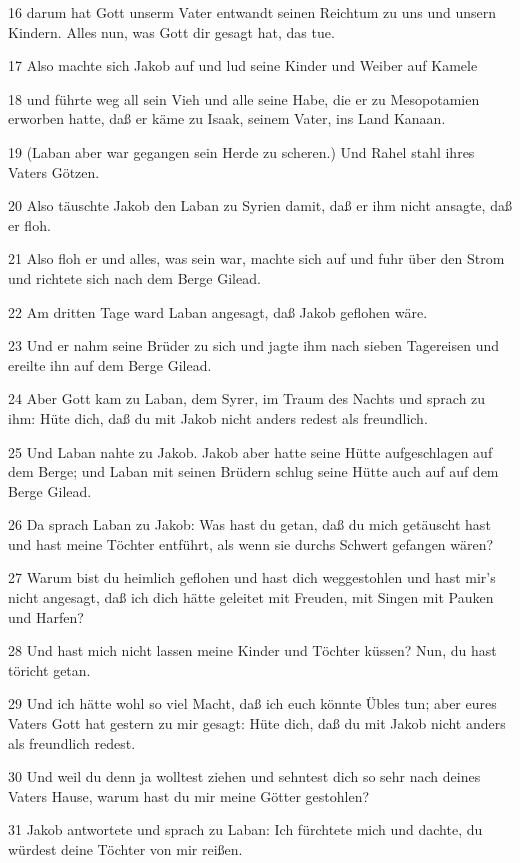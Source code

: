 \par 16 darum hat Gott unserm Vater entwandt seinen Reichtum zu uns und unsern Kindern. Alles nun, was Gott dir gesagt hat, das tue.
\par 17 Also machte sich Jakob auf und lud seine Kinder und Weiber auf Kamele
\par 18 und führte weg all sein Vieh und alle seine Habe, die er zu Mesopotamien erworben hatte, daß er käme zu Isaak, seinem Vater, ins Land Kanaan.
\par 19 (Laban aber war gegangen sein Herde zu scheren.) Und Rahel stahl ihres Vaters Götzen.
\par 20 Also täuschte Jakob den Laban zu Syrien damit, daß er ihm nicht ansagte, daß er floh.
\par 21 Also floh er und alles, was sein war, machte sich auf und fuhr über den Strom und richtete sich nach dem Berge Gilead.
\par 22 Am dritten Tage ward Laban angesagt, daß Jakob geflohen wäre.
\par 23 Und er nahm seine Brüder zu sich und jagte ihm nach sieben Tagereisen und ereilte ihn auf dem Berge Gilead.
\par 24 Aber Gott kam zu Laban, dem Syrer, im Traum des Nachts und sprach zu ihm: Hüte dich, daß du mit Jakob nicht anders redest als freundlich.
\par 25 Und Laban nahte zu Jakob. Jakob aber hatte seine Hütte aufgeschlagen auf dem Berge; und Laban mit seinen Brüdern schlug seine Hütte auch auf auf dem Berge Gilead.
\par 26 Da sprach Laban zu Jakob: Was hast du getan, daß du mich getäuscht hast und hast meine Töchter entführt, als wenn sie durchs Schwert gefangen wären?
\par 27 Warum bist du heimlich geflohen und hast dich weggestohlen und hast mir's nicht angesagt, daß ich dich hätte geleitet mit Freuden, mit Singen mit Pauken und Harfen?
\par 28 Und hast mich nicht lassen meine Kinder und Töchter küssen? Nun, du hast töricht getan.
\par 29 Und ich hätte wohl so viel Macht, daß ich euch könnte Übles tun; aber eures Vaters Gott hat gestern zu mir gesagt: Hüte dich, daß du mit Jakob nicht anders als freundlich redest.
\par 30 Und weil du denn ja wolltest ziehen und sehntest dich so sehr nach deines Vaters Hause, warum hast du mir meine Götter gestohlen?
\par 31 Jakob antwortete und sprach zu Laban: Ich fürchtete mich und dachte, du würdest deine Töchter von mir reißen.
